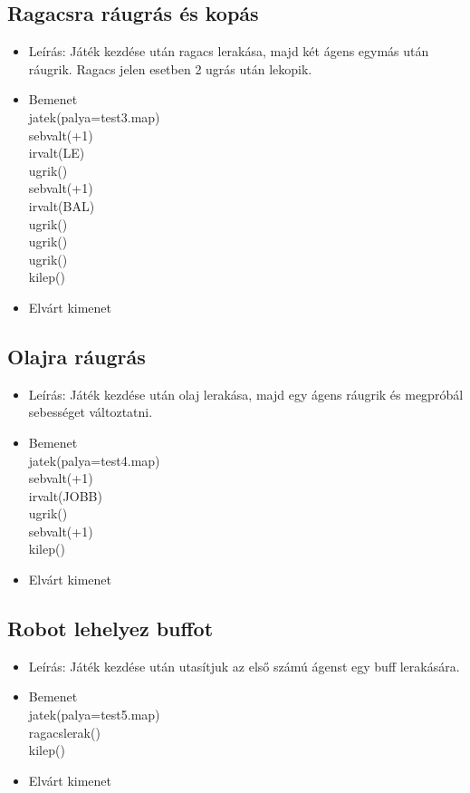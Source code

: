\subsection{Ragacsra ráugrás és kopás}
\begin{itemize}
	\item Leírás: Játék kezdése után ragacs lerakása, majd két ágens egymás után ráugrik. Ragacs jelen esetben 2 ugrás után lekopik.
	\item Bemenet\\
    jatek(palya=test3.map) \\
    sebvalt(+1) \\
    irvalt(LE) \\
    ugrik() \\ 
    sebvalt(+1) \\
    irvalt(BAL) \\ 
    ugrik() \\
    ugrik() \\ 
    ugrik()\\ 
    kilep()\\
	\item Elvárt kimenet\\

\end{itemize}

\subsection{Olajra ráugrás}
\begin{itemize}
	\item Leírás: Játék kezdése után olaj lerakása, majd egy ágens ráugrik és megpróbál sebességet változtatni. 
	\item Bemenet\\	
    jatek(palya=test4.map)\\
    sebvalt(+1)\\
    irvalt(JOBB)\\
    ugrik()\\
    sebvalt(+1)\\
    kilep()\\
	\item Elvárt kimenet\\

\end{itemize}

\subsection{Robot lehelyez buffot}
\begin{itemize}
	\item Leírás: Játék kezdése után utasítjuk az első számú ágenst egy buff lerakására.
	\item Bemenet\\	
    jatek(palya=test5.map)\\
    ragacslerak()\\
    kilep()\\
	\item Elvárt kimenet\\
		
\end{itemize}

